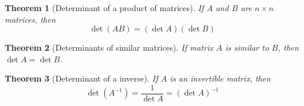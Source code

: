 \documentclass[letter]{article}
\newtheorem{theorem}{Theorem}[section]
\begin{document}
\begin{theorem}[Determinant of a product of matrices]
If $A$ and $B$ are $n\times n$ matrices, then
\[
\det(AB) = (\det A)(\det B)
\]
\end{theorem}

\begin{theorem}[Determinants of similar matrices]
If matrix $A$ is similar to $B$, then $\det A = \det B$.
\end{theorem}

\begin{theorem}[Determinant of a inverse]
If $A$ is an invertible matrix, then
\[
\det(A^{-1}) = \frac{1}{\det A} = (\det A)^{-1}
\]
\end{theorem}
\end{document}

